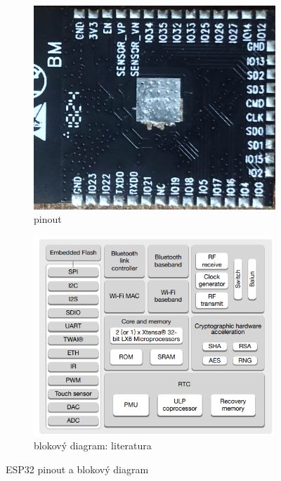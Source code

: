 \documentclass[a4paper, 12pt]{report}
\begin{document}
    \begin{figure}[h!]
        \centering
        \begin{subfigure}[b]{0.4\linewidth}
            \includegraphics[width=\linewidth]{images/ESP32_piny}
            \caption{pinout}
        \end{subfigure}
        \begin{subfigure}[b]{0.5\linewidth}
            \includegraphics[width=\linewidth]{images/ESP32_diagram}
            \caption{blokový diagram: literatura~\cite{ESP32}}
        \end{subfigure}
        \caption{ESP32 pinout a blokový diagram}
        \label{fig:esp32_diagram_pinout}
    \end{figure}
\end{document}
